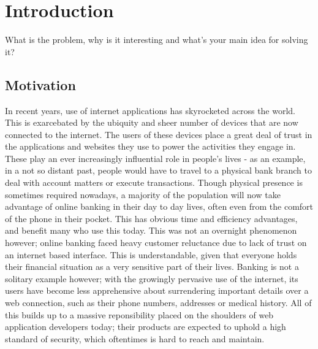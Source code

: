 \chapter{Introduction}

What is the problem, why is it interesting and what’s your main idea for solving it? 



\section{Motivation}

In recent years, use of internet applications has skyrocketed across the world. This is exarcebated by the ubiquity and sheer number of devices that are now connected to the internet. 
The users of these devices place a great deal of trust in the applications and websites they use to power the activities they engage in. 
These play an ever increasingly influential role in people's lives - as an example, in a not so distant past, people would have to travel to a physical bank branch to deal with account matters or execute transactions. Though physical presence is sometimes required nowadays, a majority of the population will now take advantage of online banking in their day to day lives, often even from the comfort of the phone in their pocket. This has obvious time and efficiency advantages, and benefit many who use this today.
This was not an overnight phenomenon however; online banking faced heavy customer reluctance due to lack of trust on an internet based interface. 
This is understandable, given that everyone holds their financial situation as a very sensitive part of their lives.
Banking is not a solitary example however; with the growingly pervasive use of the internet, its users have become less apprehensive about surrendering important details over a web connection, such as their phone numbers, addresses or medical history.  
All of this builds up to a massive reponsibility placed on the shoulders of web application developers today; their products are expected to uphold a high standard of security, which oftentimes is hard to reach and maintain. \\


